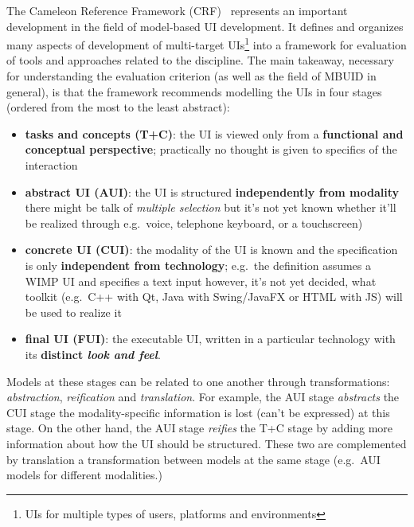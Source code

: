 The Cameleon Reference Framework (CRF)~\cite{calvary_cameleon_framework_2002, calvary_cameleon_glossary_2002} represents an important development in the field of model-based UI development.
It defines and organizes many aspects of development of multi-target UIs\footnote{UIs for multiple types of users, platforms and environments} into a framework for evaluation of tools and approaches related to the discipline.
The main takeaway, necessary for understanding the evaluation criterion (as well as the field of MBUID in general), is that the framework recommends modelling the UIs in four stages (ordered from the most to the least abstract):
\begin{itemize}
    \item \textbf{tasks and concepts (T+C)}: the UI is viewed only from a \textbf{functional and conceptual perspective};
          practically no thought is given to specifics of the interaction
    \item \textbf{abstract UI (AUI)}: the UI is structured \textbf{independently from modality}\,\textemdash\,there might be talk of \emph{multiple selection} but it's not yet known whether it'll be realized through e.g.\ voice, telephone keyboard, or a touchscreen)
    \item \textbf{concrete UI (CUI)}: the modality of the UI is known and the specification is only \textbf{independent from technology};
          e.g.\ the definition assumes a WIMP UI and specifies a text input\,\textemdash\,however, it's not yet decided, what toolkit (e.g.\ C++ with Qt, Java with Swing/JavaFX or HTML with JS) will be used to realize it
    \item \textbf{final UI (FUI)}: the executable UI, written in a particular technology with its \textbf{distinct \emph{look and feel}}.
\end{itemize}

Models at these stages can be related to one another through transformations: \emph{abstraction}, \emph{reification} and \emph{translation}.
For example, the AUI stage \emph{abstracts} the CUI stage\,\textemdash\,the modality-specific information is lost (can't be expressed) at this stage.
On the other hand, the AUI stage \emph{reifies} the T+C stage by adding more information about how the UI should be structured.
These two are complemented by translation\,\textemdash\,a transformation between models at the same stage (e.g.\ AUI models for different modalities.)


